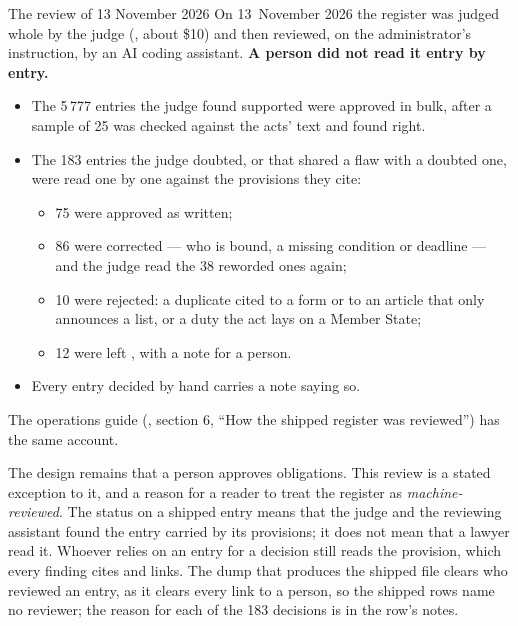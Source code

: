 \begin{notebox}{The review of 13 November 2026}
On 13~November 2026 the register was judged whole by the judge
(, about \$10) and then reviewed, on the administrator's
instruction, by an AI coding assistant. \textbf{A person did not read it entry by entry.}

\begin{itemize}
  \item The 5\,777 entries the judge found supported were approved in bulk, after a sample
    of 25 was checked against the acts' text and found right.
  \item The 183 entries the judge doubted, or that shared a flaw with a doubted one, were
    read one by one against the provisions they cite:
    \begin{itemize}
      \item 75 were approved as written;
      \item 86 were corrected --- who is bound, a missing condition or deadline --- and the
        judge read the 38 reworded ones again;
      \item 10 were rejected: a duplicate cited to a form or to an article that only
        announces a list, or a duty the act lays on a Member State;
      \item 12 were left , with a note for a person.
    \end{itemize}
  \item Every entry decided by hand carries a note saying so.
\end{itemize}

The operations guide (, section 6, \enquote{How the shipped
register was reviewed}) has the same account.
\end{notebox}

The design remains that a person approves obligations. This review is a stated exception to
it, and a reason for a reader to treat the register as \emph{machine-reviewed}. The status
 on a shipped entry means that the judge and the reviewing assistant found
the entry carried by its provisions; it does not mean that a lawyer read it. Whoever relies
on an entry for a decision still reads the provision, which every finding cites and links.
The dump that produces the shipped file clears who reviewed an entry, as it clears every
link to a person, so the shipped rows name no reviewer; the reason for each of the 183
decisions is in the row's notes.


